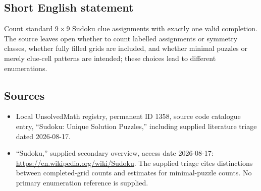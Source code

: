 \documentclass[11pt]{article}
\begin{document}
\subsection{Short English statement}
Count standard \(9\times9\) Sudoku clue assignments with exactly one valid completion. The source leaves open whether to count labelled assignments or symmetry classes, whether fully filled grids are included, and whether minimal puzzles or merely clue-cell patterns are intended; these choices lead to different enumerations.
\subsection{Sources}
\begin{itemize}
\item Local UnsolvedMath registry, permanent ID 1358, source code catalogue entry, ``Sudoku: Unique Solution Puzzles,'' including supplied literature triage dated 2026-08-17.
\item ``Sudoku,'' supplied secondary overview, access date 2026-08-17: \url{https://en.wikipedia.org/wiki/Sudoku}. The supplied triage cites distinctions between completed-grid counts and estimates for minimal-puzzle counts. No primary enumeration reference is supplied.
\end{itemize}
\end{document}
